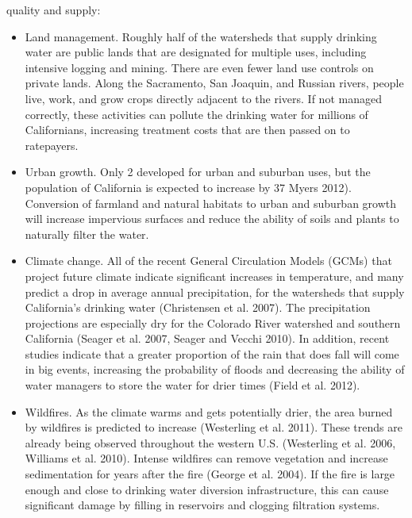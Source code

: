 \documentclass{article}
\begin{document}
quality and supply:
\begin{itemize}
\item Land management. Roughly half of the watersheds that supply drinking water are
public lands that are designated for multiple uses, including intensive logging and
mining. There are even fewer land use controls on private lands. Along the
Sacramento, San Joaquin, and Russian rivers, people live, work, and grow crops directly
adjacent to the rivers. If not managed correctly, these activities can pollute the drinking
water for millions of Californians, increasing treatment costs that are then passed on to
ratepayers.
\item Urban growth. Only 2%
developed for urban and suburban uses, but the population of California is expected to
increase by 37%
Myers 2012). Conversion of farmland and natural habitats to urban and suburban
growth will increase impervious surfaces and reduce the ability of soils and plants to
naturally filter the water.
\item Climate change. All of the recent General Circulation Models (GCMs) that project future
climate indicate significant increases in temperature, and many predict a drop in
average annual precipitation, for the watersheds that supply California’s drinking water
(Christensen et al. 2007). The precipitation projections are especially dry for the
Colorado River watershed and southern California (Seager et al. 2007, Seager and Vecchi
2010). In addition, recent studies indicate that a greater proportion of the rain that
does fall will come in big events, increasing the probability of floods and decreasing the
ability of water managers to store the water for drier times (Field et al. 2012).
\item Wildfires. As the climate warms and gets potentially drier, the area burned by wildfires
is predicted to increase (Westerling et al. 2011). These trends are already being
observed throughout the western U.S. (Westerling et al. 2006, Williams et al. 2010).
Intense wildfires can remove vegetation and increase sedimentation for years after the
fire (George et al. 2004). If the fire is large enough and close to drinking water diversion
infrastructure, this can cause significant damage by filling in reservoirs and clogging
filtration systems.
\end{itemize}
\end{document}
